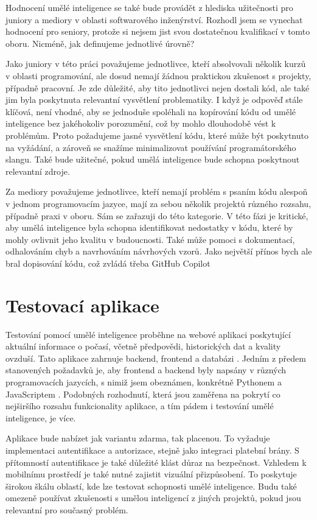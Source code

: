 \documentclass[FM,DP]{tulthesis}
\begin{document}
		Hodnocení umělé inteligence se také bude provádět z hlediska užitečnosti pro juniory a mediory v oblasti softwarového inženýrství. Rozhodl jsem se vynechat hodnocení pro seniory, protože si nejsem jist svou dostatečnou kvalifikací v tomto oboru. Nicméně, jak definujeme jednotlivé úrovně?
		
		Jako juniory v této práci považujeme jednotlivce, kteří absolvovali několik kurzů v oblasti programování, ale dosud nemají žádnou praktickou zkušenost s projekty, případně pracovní. Je zde důležité, aby tito jednotlivci nejen dostali kód, ale také jim byla poskytnuta relevantní vysvětlení problematiky. I když je odpověď stále klíčová, není vhodné, aby se jednoduše spoléhali na kopírování kódu od umělé inteligence bez jakéhokoliv porozumění, což by mohlo dlouhodobě vést k problémům. Proto požadujeme jasné vysvětlení kódu, které může být poskytnuto na vyžádání, a zároveň se snažíme minimalizovat používání programátorského slangu. Také bude užitečné, pokud umělá inteligence bude schopna poskytnout relevantní zdroje.
		
		Za mediory považujeme jednotlivce, kteří nemají problém s psaním kódu alespoň v jednom programovacím jazyce, mají za sebou několik projektů různého rozsahu, případně praxi v oboru. Sám se zařazuji do této kategorie. V této fázi je kritické, aby umělá inteligence byla schopna identifikovat nedostatky v kódu, které by mohly ovlivnit jeho kvalitu v budoucnosti. Také může pomoci s dokumentací, odhalováním chyb a navrhováním návrhových vzorů. Jako největší přínos bych ale bral dopisování kódu, což zvládá třeba GitHub Copilot \cite{gitCopilot}
		
		\section{Testovací aplikace}
		Testování pomocí umělé inteligence proběhne na webové aplikaci poskytující aktuální informace o počasí, včetně předpovědi, historických dat a kvality ovzduší. Tato aplikace zahrnuje backend, frontend a databázi \cite{webapp_basics}. Jedním z předem stanovených požadavků je, aby frontend a backend byly napsány v různých programovacích jazycích, s nimiž jsem obeznámen, konkrétně Pythonem \cite{python} a JavaScriptem \cite{nodejs}. Podobných rozhodnutí, která jsou zaměřena na pokrytí co nejširšího rozsahu funkcionality aplikace, a tím pádem i testování umělé inteligence, je více.
		
		Aplikace bude nabízet jak variantu zdarma, tak placenou. To vyžaduje implementaci autentifikace a autorizace, stejně jako integraci platební brány. S přítomností autentifikace je také důležité klást důraz na bezpečnost. Vzhledem k mobilnímu prostředí je také nutné zajistit vizuální přizpůsobení. To poskytuje širokou škálu oblastí, kde lze testovat schopnosti umělé inteligence. Budu také omezeně používat zkušenosti s umělou inteligencí z jiných projektů, pokud jsou relevantní pro současný problém.
		
\end{document}
